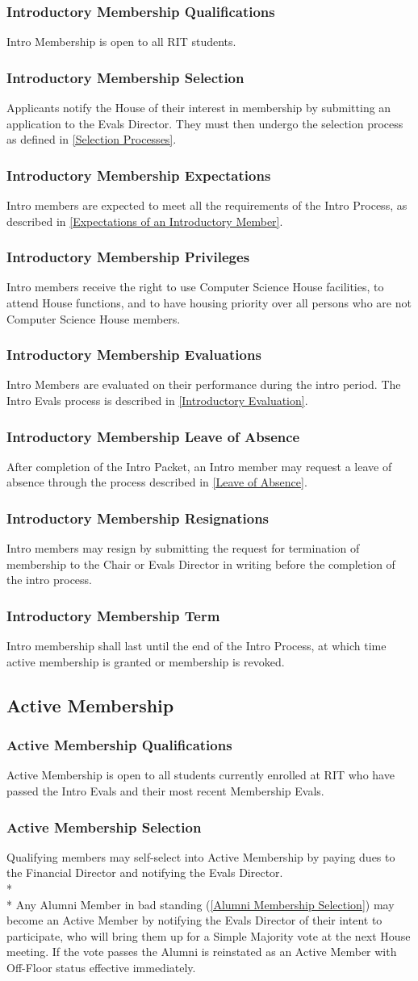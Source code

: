 \documentclass{article}
\newcommand{\asection}[1]{\subsection{#1} \label{#1}}
\newcommand{\asubsection}[1]{\subsubsection{#1} \label{#1}}
\begin{document}
\asubsection{Introductory Membership Qualifications}
Intro Membership is open to all RIT students.

\asubsection{Introductory Membership Selection}
Applicants notify the House of their interest in membership by submitting an application to the Evals Director.
They must then undergo the selection process as defined in \ref{Selection Processes}.

\asubsection{Introductory Membership Expectations}
Intro members are expected to meet all the requirements of the Intro Process, as described in \ref{Expectations of an Introductory Member}.

\asubsection{Introductory Membership Privileges}
Intro members receive the right to use Computer Science House facilities, to attend House functions, and to have housing priority over all persons who are not Computer Science House members.

\asubsection{Introductory Membership Evaluations}
Intro Members are evaluated on their performance during the intro period.
The Intro Evals process is described in \ref{Introductory Evaluation}.

\asubsection{Introductory Membership Leave of Absence}
After completion of the Intro Packet, an Intro member may request a leave of absence through the process described in \ref{Leave of Absence}.

\asubsection{Introductory Membership Resignations}
Intro members may resign by submitting the request for termination of membership to the Chair or Evals Director in writing before the completion of the intro process.
\asubsection{Introductory Membership Term}
Intro membership shall last until the end of the Intro Process, at which time active membership is granted or membership is revoked.

\asection{Active Membership}

\asubsection{Active Membership Qualifications}
Active Membership is open to all students currently enrolled at RIT who have passed the Intro Evals and their most recent Membership Evals.

\asubsection{Active Membership Selection}
Qualifying members may self-select into Active Membership by paying dues to the Financial Director and notifying the Evals Director.
\\*\\*
Any Alumni Member in bad standing (\ref{Alumni Membership Selection}) may become an Active Member by notifying the Evals Director of their intent to participate, who will bring them up for a Simple Majority vote at the next House meeting.
If the vote passes the Alumni is reinstated as an Active Member with Off-Floor status effective immediately.
\end{document}
